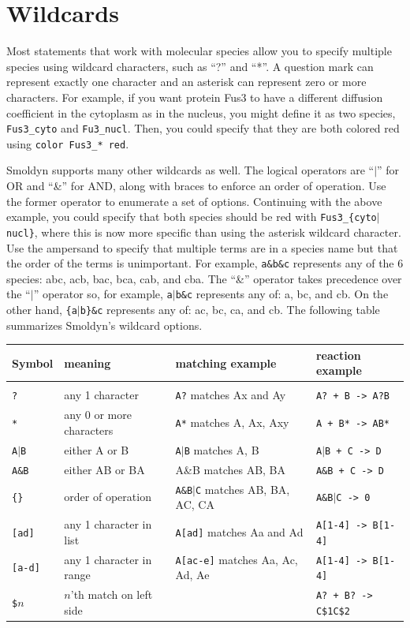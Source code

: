 \documentclass {book}
\newcommand {\ttt} {\texttt}
\begin{document}
\section{Wildcards}

Most statements that work with molecular species allow you to specify multiple species using wildcard characters, such as ``?'' and ``*''. A question mark can represent exactly one character and an asterisk can represent zero or more characters. For example, if you want protein Fus3 to have a different diffusion coefficient in the cytoplasm as in the nucleus, you might define it as two species, \ttt{Fus3\_cyto} and \ttt{Fu3\_nucl}. Then, you could specify that they are both colored red using \ttt{color Fus3\_* red}.

Smoldyn supports many other wildcards as well. The logical operators are ``$|$'' for OR and ``\&'' for AND, along with braces to enforce an order of operation. Use the former operator to enumerate a set of options. Continuing with the above example, you could specify that both species should be red with \ttt{Fus3\_\{cyto$|$nucl\}}, where this is now more specific than using the asterisk wildcard character. Use the ampersand to specify that multiple terms are in a species name but that the order of the terms is unimportant. For example, \ttt{a\&b\&c} represents any of the 6 species: abc, acb, bac, bca, cab, and cba. The ``\&'' operator takes precedence over the ``$|$'' operator so, for example, \ttt{a$|$b\&c} represents any of: a, bc, and cb. On the other hand, \ttt{\{a$|$b\}\&c} represents any of: ac, bc, ca, and cb. The following table summarizes Smoldyn's wildcard options.

\begin{longtable}[c]{llll}
Symbol & meaning & matching example & reaction example\\
\hline \\
\ttt{?} & any 1 character & \ttt{A?} matches Ax and Ay & \ttt{A? + B -> A?B}\\
\ttt{*} & any 0 or more characters & \ttt{A*} matches A, Ax, Axy & \ttt{A + B* -> AB*}\\
\ttt{A$|$B} & either A or B & \ttt{A$|$B} matches A, B & \ttt{A$|$B + C -> D}\\
\ttt{A\&B} & either AB or BA & A\&B matches AB, BA & \ttt{A\&B + C -> D}\\
\ttt{\{\}} & order of operation & \ttt{A\&{B$|$C}} matches AB, BA, AC, CA & \ttt{A\&{B$|$C} -> 0}\\
\ttt{[ad]} & any 1 character in list & \ttt{A[ad]} matches Aa and Ad & \ttt{A[1-4] -> B[1-4]}\\
\ttt{[a-d]} & any 1 character in range & \ttt{A[ac-e]} matches Aa, Ac, Ad, Ae & \ttt{A[1-4] -> B[1-4]}\\
\ttt{\$}$n$ & $n$'th match on left side &  & \ttt{A? + B? -> C\$1C\$2}
\end{longtable}
\end{document}
